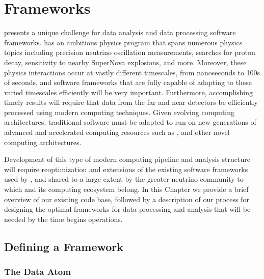 \documentclass[../main-v1.tex]{subfiles}
\begin{document}
\chapter{Frameworks}\label{ch:fworks}

 presents a unique challenge for data analysis and data processing software frameworks. 
 has an ambitious physics program that spans numerous physics topics including precision neutrino oscillation measurements, searches for proton decay, sensitivity to nearby SuperNova explosions, and more. Moreover, these physics interactions occur at vastly different timescales, from nanoseconds to 100s of seconds, and software frameworks that are fully capable of adapting to these varied timescales efficiently will be very important. Furthermore, accomplishing timely results will require that data from the  far and near detectors  be efficiently processed using modern computing techniques. Given evolving computing architectures, traditional  software must be adapted to run on new generations of advanced and accelerated computing resources such as ,  and other novel computing architectures.  

Development of this type of modern computing pipeline and analysis structure will require reoptimization and extensions of the existing software frameworks used by , and shared to a large extent by the greater neutrino community to which  and its computing ecosystem belong.
In this Chapter we provide a brief overview of our existing code base, followed by a description of our process for designing the optimal frameworks for data processing and analysis that will be needed by the time  begins operations.  

\section{Defining a Framework}\label{sec:framework:def}

\subsection{The Data Atom}
\end{document}
